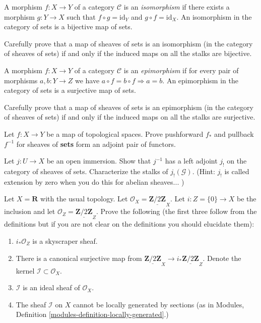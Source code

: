 \noindent
A morphism $f : X \to Y$ of a category $\mathcal{C}$ is an {\it isomorphism}
if there exists a morphism $g : Y \to X$ such that $f \circ g = \text{id}_Y$
and $g \circ f = \text{id}_X$. An isomorphism in the category of sets
is a bijective map of sets.

\begin{exercise}
\label{exercise-isomorphism-sheaves-sets}
Carefully prove that a map of sheaves of sets is an isomorphism
(in the category of sheaves of sets) if and only if the induced maps on
all the stalks are bijective.
\end{exercise}

\noindent
A morphism $f : X \to Y$ of a category $\mathcal{C}$ is an {\it epimorphism}
if for every pair of morphisms $a, b : Y \to Z$ we have
$a \circ f = b \circ f \Rightarrow a = b$. An epimorphism in the
category of sets is a surjective map of sets.

\begin{exercise}
\label{exercise-epi-sheaves-sets}
Carefully prove that a map of sheaves of sets is an epimorphism
(in the category of sheaves of sets) if and only if the induced maps on
all the stalks are surjective.
\end{exercise}

\begin{exercise}
\label{exercise-adjoint-push-pull}
Let $f : X \to Y$ be a map of topological spaces.
Prove pushforward $f_\ast$ and pullback $f^{-1}$ for sheaves of {\bf sets}
form an adjoint pair of functors.
\end{exercise}

\begin{exercise}
\label{exercise-j-shriek}
Let $j : U \to X$ be an open immersion. Show
that $j^{-1}$ has a left adjoint $j_{!}$ on the category of sheaves
of sets. Characterize the stalks of $j_{!}({\mathcal G})$. (Hint: $j_{!}$
is called extension by zero when you do this for abelian sheaves... )
\end{exercise}

\begin{exercise}
\label{exercise-not-locally-generated-by-sections}
Let $X = \mathbf{R}$ with the usual topology.
Let $\mathcal{O}_X = \underline{\mathbf{Z}/2\mathbf{Z}}_X$.
Let $i : Z = \{0\} \to X$ be the inclusion and let
$\mathcal{O}_Z = \underline{\mathbf{Z}/2\mathbf{Z}}_Z$.
Prove the following (the first three follow from the definitions but if you
are not clear on the definitions you should elucidate them):
\begin{enumerate}
\item $i_*\mathcal{O}_Z$ is a skyscraper sheaf.
\item There is a canonical surjective map from
$\underline{\mathbf{Z}/2\mathbf{Z}}_X \to
i_*\underline{\mathbf{Z}/2\mathbf{Z}}_Z$.
Denote the kernel $\mathcal{I} \subset \mathcal{O}_X$.
\item $\mathcal{I}$ is an ideal sheaf of $\mathcal{O}_X$.
\item The sheaf $\mathcal{I}$ on $X$ cannot be locally generated
by sections (as in
Modules, Definition \ref{modules-definition-locally-generated}.)
\end{enumerate}
\end{exercise}

